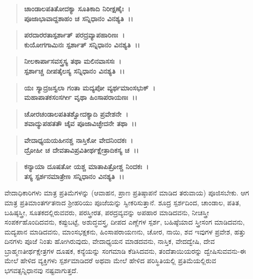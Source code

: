 \begin{verse}
\textbf{ಚಾಂಡಾಲಪತಿತೋದಕ್ಯಾ ಸೂತಿಕಾದಿ ನಿರೀಕ್ಷಣೈಃ~।}\\\textbf{ಪೂಜಾಭಾವಾದ್ದಶಾಹಂ ಚ ಸನ್ನಿಧಾನಂ ವಿನಶ್ಯತಿ~।।}
\end{verse}

\begin{verse}
\textbf{ಪರದಾರರತಾಸ್ಪರ್ಶಾತ್ ಪರದ್ರವ್ಯಾಪಹಾರಿಣಃ~।}\\\textbf{ಕುಯೋಗಗಾಮಿನಃ ಸ್ಪರ್ಶಾತ್ ಸನ್ನಿಧಾನಂ ವಿನಶ್ಯತಿ~।।}
\end{verse}

\begin{verse}
\textbf{ನೀಲಕಾರ್ಪಾಸವಸ್ತ್ರಸ್ಯ ತಥಾ ಮಲಿನವಾಸಸಃ~।}\\\textbf{ಸ್ಪರ್ಶಾಚ್ಚ ದೀಪತೈಲಸ್ಯ ಸನ್ನಿಧಾನಂ ವಿನಶ್ಯತಿ~।।}
\end{verse}

\begin{verse}
\textbf{ಯಃ ಸ್ಯಾದ್ರಜಸ್ವಲಾ ಗಂತಾ ಮದ್ಯಪೋ ವ್ಯರ್ಥಮಾಂಸಭುಕ್~।}\\\textbf{ಮಹಾಪಾತಕಸಂಸರ್ಗೀ ವೃಥಾ ಹಿಂಸಾಪರಾಯಣಃ~।।}
\end{verse}

\begin{verse}
\textbf{ಚೋರಚಂಡಾಲಪತಿತಶ್ವೋದಕ್ಯಾದಿ ಪ್ರವೇಶನೇ~।}\\\textbf{ಶವಾದ್ಯುಪಹತತೌ ಚೈವ ಪೂಜಾವಿಚ್ಛೇದನೇ ತಥಾ~।।}
\end{verse}

\begin{verse}
\textbf{ವೇದಾಧ್ಯಯಯಹೀನಶ್ಚ ನಾಸ್ತಿಕೋ ವೇದನಿಂದಕಃ~।}\\\textbf{ದ್ರೋಹೀ ಚ ದೇವತಾವಿಪ್ರವಿತೀರ್ಥಕ್ಷೇತ್ರಾದಿಕಸ್ಯ ಚ~।।}
\end{verse}

\begin{verse}
\textbf{ಕನ್ಯಾಯಾ ದೂಷತೋ ಯಶ್ಚ ಮಾತಾಪಿತ್ರೋಶ್ಚ ನಿಂದಕಃ~।}\\\textbf{ತಸ್ಯ ಸ್ಪರ್ಶನಮಾತ್ರೇಣ ಸನ್ನಿಧಾನಂ ವಿನಶ್ಯತಿ~।।}
\end{verse}


ವೇದಾಧಿಕಾರಿಗಳು ಮಾತ್ರ ಪ್ರತಿಮೆಗಳನ್ನು (ಆವಾಹನ, ಪ್ರಾಣ ಪ್ರತಿಷ್ಠಾಪನೆ ಮಾಡಿದ ತರುವಾಯ) ಪೂಜಿಸಬೇಕು. ಆಗ ಮಾತ್ರ ಪ್ರತಿಮಾಂತರ್ಗತನಾದ ಶ‍್ರೀಹರಿಯು ಪೂಜೆಯನ್ನು ಸ್ವೀಕರಿಸುತ್ತಾನೆ. ಶೂದ್ರ ಸ್ಪರ್ಶದಿಂದ, ಚಾಂಡಾಲ, ಪತಿತ, ಬಹಿಷ್ಠಸ್ತ್ರೀ, ಸೂತಕದಲ್ಲಿರುವವರು, ಪರಸ್ತ್ರೀರತ, ಪರದ್ರವ್ಯವನ್ನು ಅಪಹಾರ ಮಾಡಿದವನು, ನೀಚಸ್ತ್ರೀ ಸಂಪರ್ಕಹೊಂದಿದವನು, ಕಪ್ಪುಬಟ್ಟೆ, ಅಶುದ್ಧವಸ್ತ್ರ, ದೀಪದ ಎಣ್ಣೆಗಳ ಸ್ಪರ್ಶ, ಬಹಿಷ್ಠೆಯಾದ ಸ್ತ್ರೀಸಂಗ ಮಾಡಿದವನು, ಮದ್ಯಪಾನ ಮಾಡಿದವನು, ಮಾಂಸಭಕ್ಷಕನು, ಹಿಂಸಾಪರಾಯಣನು, ಚೋರ, ನಾಯಿ, ಶವ ಇವುಗಳ ಪ್ರವೇಶ, ಹತ್ತು ದಿನಗಳು ಪೂಜೆ ನಿಂತು ಹೋಗಿರುವುದು, ವೇದಾಧ್ಯಯನ ಮಾಡದವನು, ನಾಸ್ತಿಕ, ವೇದದ್ವೇಷಿ, ದೇವ ಬ್ರಾಹ್ಮಣತೀರ್ಥಕ್ಷೇತ್ರಗಳ ದೂಷಕ, ಕನ್ಯೆಯನ್ನು ಸಂಗಮಾಡಿ ಕೆಡಿಸಿದವನು, ತಂದೆತಾಯಿಯರನ್ನು ದ್ವೇಷಿಸು\-ವವನು-ಈ ಮೇಲೆ ಹೇಳಿದ ವ್ಯಕ್ತಿಗಳು ಸ್ಪರ್ಶಮಾಡಿದರೆ ಅಥವಾ ಮೇಲೆ ಹೇಳಿದ ಪರಿಸ್ಥಿತಿಯಲ್ಲಿ ಪ್ರತಿಮೆಯಲ್ಲಿರುವ ಭಗವತ್ಸನ್ನಿಧಾನವು ನಷ್ಟವಾಗುತ್ತದೆ.

